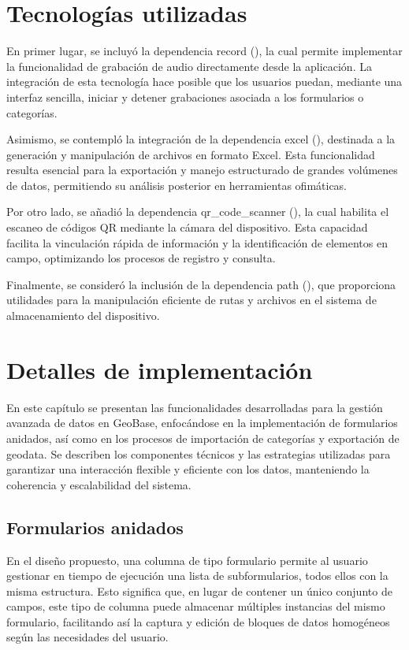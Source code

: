 \documentclass[12pt, a4paper]{book}
\begin{document}
\section{Tecnologías utilizadas}

En primer lugar, se incluyó la dependencia record (\cite{record2024}), la cual permite implementar la funcionalidad de grabación de audio directamente desde la aplicación. La integración de esta tecnología hace posible que los usuarios puedan, mediante una interfaz sencilla, iniciar y detener grabaciones asociada a los formularios o categorías.

Asimismo, se contempló la integración de la dependencia excel (\cite{excel2024}), destinada a la generación y manipulación de archivos en formato Excel. Esta funcionalidad resulta esencial para la exportación y manejo estructurado de grandes volúmenes de datos, permitiendo su análisis posterior en herramientas ofimáticas. 

Por otro lado, se añadió la dependencia qr\_code\_scanner (\cite{qrcodescanner2024}), la cual habilita el escaneo de códigos QR mediante la cámara del dispositivo. Esta capacidad facilita la vinculación rápida de información y la identificación de elementos en campo, optimizando los procesos de registro y consulta.

Finalmente, se consideró la inclusión de la dependencia path (\cite{path2024}), que proporciona utilidades para la manipulación eficiente de rutas y archivos en el sistema de almacenamiento del dispositivo.


\section{Detalles de implementación}

En este capítulo se presentan las funcionalidades desarrolladas para la gestión avanzada de datos en GeoBase, enfocándose en la implementación de formularios anidados, así como en los procesos de importación de categorías y exportación de geodata. Se describen los componentes técnicos y las estrategias utilizadas para garantizar una interacción flexible y eficiente con los datos, manteniendo la coherencia y escalabilidad del sistema.

\subsection{Formularios anidados}

En el diseño propuesto, una columna de tipo formulario permite al usuario gestionar en tiempo de ejecución una lista de subformularios, todos ellos con la misma estructura. Esto significa que, en lugar de contener un único conjunto de campos, este tipo de columna puede almacenar múltiples instancias del mismo formulario, facilitando así la captura y edición de bloques de datos homogéneos según las necesidades del usuario.
\end{document}
